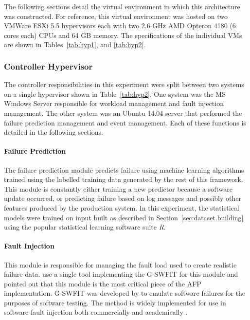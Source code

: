 
The following sections detail the virtual environment in which this
architecture was constructed.  For reference, this virtual environment was
hosted on two VMWare ESXi 5.5 hypervisors each with two 2.6 \ac{GHz} AMD
Opteron 4180 (6 cores each) \ac{CPU}s and 64 \ac{GB} memory.  The
specifications of the individual \ac{VM}s are shown in Tables~\ref{tab:hyp1},
and \ref{tab:hyp2}.

\tabHypervisorOne
\tabHypervisorTwo

\setcounter{secnumdepth}{5}

\subsubsection{Controller Hypervisor} \label{sec:controller} %
The controller responsibilities in this experiment were split between two
systems on a single hypervisor shown in Table~\ref{tab:hyp2}.  One system was
the \ac{MS} Windows Server responsible for workload management and fault
injection management.  The other system was an Ubuntu 14.04 server that
performed the failure prediction management and event management.  Each of
these functions is detailed in the following sections.

\paragraph{Failure Prediction} \label{sec:failurePrediction} %
The failure prediction module predicts failure using machine learning
algorithms trained using the labelled training data generated by the rest of
this framework.  This module is constantly either training a new predictor
because a software update occurred, or predicting failure based on log messages
and possibly other features produced by the production system.  In this
experiment, the statistical models were trained on input built as described in
Section~\ref{sec:dataset.building} using the popular statistical learning
software suite \emph{R}.

\paragraph{Fault Injection} \label{sec:faultInjectionMgr}
This module is responsible for managing the fault load used to create realistic
failure data.  \citet{irrera2015} use a single tool implementing the
\ac{G-SWFIT} for this module and pointed out that this module is the most
critical piece of the \ac{AFP} implementation.  \ac{G-SWFIT} was developed by
\citet{gswfit} to emulate software failures for the purposes of software
testing.  The method is widely implemented for use in software fault injection
both commercially and academically
\citep{cotroneo2012,irrera2014,natella2010,umadevi2015}. 


